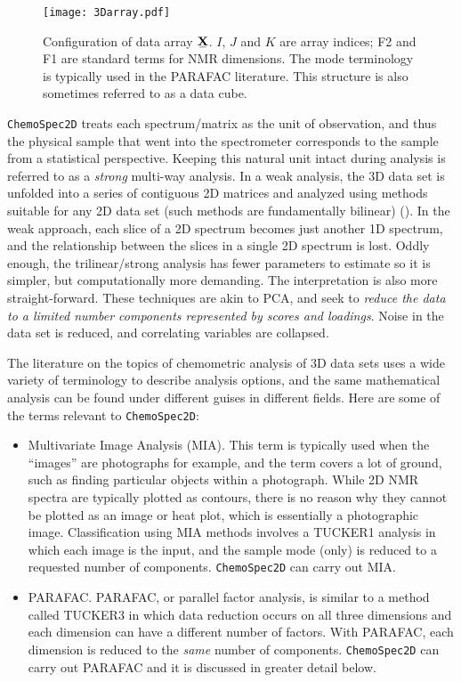 \documentclass[letter,10pt,twocolumn,twoside,printwatermark=false]{pinp}
\providecommand{\tightlist}{%
  \setlength{\itemsep}{0pt}\setlength{\parskip}{0pt}}
\begin{document}
\begin{figure}
\begin{center}
  \texttt{[image: 3Darray.pdf]}
  \caption{\label{3Darray}Configuration of data array $\stackunder[1.2pt]{$\mathbf{X}$}{\rule{1.2ex}{.075ex}}$. $I$, $J$ and $K$ are array indices; F2 and F1 are standard terms for NMR dimensions. The mode terminology is typically used in the PARAFAC literature.  This structure is also sometimes referred to as a data cube.}
\end{center}
\end{figure}

\texttt{ChemoSpec2D} treats each spectrum/matrix as the unit of
observation, and thus the physical sample that went into the
spectrometer corresponds to the sample from a statistical perspective.
Keeping this natural unit intact during analysis is referred to as a
\emph{strong} multi-way analysis. In a weak analysis, the 3D data set is
unfolded into a series of contiguous 2D matrices and analyzed using
methods suitable for any 2D data set (such methods are fundamentally
bilinear) (\cite{Huang2003}). In the weak approach, each slice of a 2D
spectrum becomes just another 1D spectrum, and the relationship between
the slices in a single 2D spectrum is lost. Oddly enough, the
trilinear/strong analysis has fewer parameters to estimate so it is
simpler, but computationally more demanding. The interpretation is also
more straight-forward. These techniques are akin to PCA, and seek to
\emph{reduce the data to a limited number components represented by
scores and loadings}. Noise in the data set is reduced, and correlating
variables are collapsed.

The literature on the topics of chemometric analysis of 3D data sets
uses a wide variety of terminology to describe analysis options, and the
same mathematical analysis can be found under different guises in
different fields. Here are some of the terms relevant to
\texttt{ChemoSpec2D}:

\begin{itemize}
\tightlist
\item
  Multivariate Image Analysis (MIA). This term is typically used when
  the ``images'' are photographs for example, and the term covers a lot
  of ground, such as finding particular objects within a photograph.
  While 2D NMR spectra are typically plotted as contours, there is no
  reason why they cannot be plotted as an image or heat plot, which is
  essentially a photographic image. Classification using MIA methods
  involves a TUCKER1 analysis in which each image is the input, and the
  sample mode (only) is reduced to a requested number of components.
  \texttt{ChemoSpec2D} can carry out MIA.
\item
  PARAFAC. PARAFAC, or parallel factor analysis, is similar to a method
  called TUCKER3 in which data reduction occurs on all three dimensions
  and each dimension can have a different number of factors. With
  PARAFAC, each dimension is reduced to the \emph{same} number of
  components. \texttt{ChemoSpec2D} can carry out PARAFAC and it is
  discussed in greater detail below.
\end{itemize}
\end{document}

